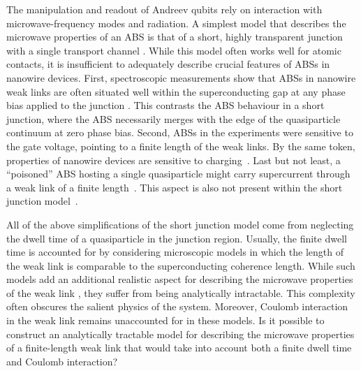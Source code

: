 \documentclass[aps,reprint,longbibliography, prb]{revtex4-2}
\begin{document}
The manipulation and readout of Andreev qubits rely on interaction with microwave-frequency modes and radiation.
A simplest model that describes the microwave properties of an ABS is that of a short, highly transparent junction with a single transport channel \cite{feigelman1999, zazunov2003, zazunov2005, kos2013}. While this model often works well for atomic contacts, it is insufficient to adequately describe crucial features of ABSs in nanowire devices. First, spectroscopic measurements show that ABSs in nanowire weak links are often situated well within the superconducting gap at any phase bias applied to the junction \cite{woerkom2017, tosi2019, hays2020}. This contrasts the ABS behaviour in a short junction, where the ABS necessarily merges with the edge of the quasiparticle continuum at zero phase bias. Second, ABSs in the experiments \cite{delange2015, larsen2015, hays2018, tosi2019} were sensitive to the gate voltage, pointing to a finite length of the weak links. 
By the same token, properties of nanowire devices are sensitive to charging~\cite{albrecht2016, deng2016}.
Last but not least, a ``poisoned'' ABS hosting a single quasiparticle might carry supercurrent through a weak link of a finite length~\cite{vandam2006}. This aspect is also not present within the short junction model~\cite{beenakker1991}. 

All of the above simplifications of the short junction model come from neglecting the dwell time of a quasiparticle in the junction region.
Usually, the finite dwell time is accounted for by considering microscopic models in which the length of the weak link is comparable to the superconducting coherence length. While such models add an additional realistic aspect for describing the microwave properties of the weak link \cite{tosi2019, metzger2021}, they suffer from being analytically intractable. This complexity often obscures the salient physics of the system. Moreover, Coulomb interaction in the weak link remains unaccounted for in these models. Is it possible to construct an analytically tractable model for describing the microwave properties of a finite-length weak link that would take into account both a finite dwell time and Coulomb interaction?
\end{document}
